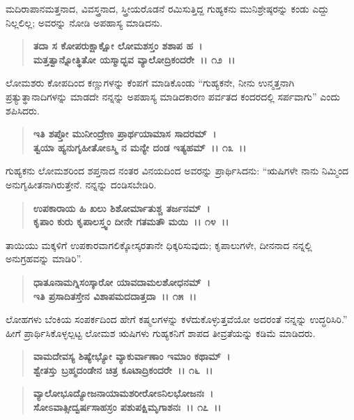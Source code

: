 ಮದಿರಾಪಾನಮತ್ತನಾದ, ವಿವಸ್ತ್ರನಾದ, ಸ್ತ್ರೀಯರೊಡನೆ ರಮಿಸುತ್ತಿದ್ದ ಗುಹ್ಯಕನು ಮುನಿಶ್ರೇಷ್ಠರನ್ನು ಕಂಡು ಎದ್ದು ನಿಲ್ಲಲಿಲ್ಲ; ಅವರನ್ನು ನೋಡಿ ಅಪಹಾಸ್ಯ ಮಾಡಿದನು.

\begin{verse}
\textbf{ತದಾ ಸ ಕೋಪರುಕ್ಷಾಕ್ಷೋ ಲೋಮಶಸ್ತಂ ಶಶಾಪ ಹ~।}\\\textbf{ಮತ್ತತ್ವಾನ್ನೋತ್ಥಿತೋ ಯಸ್ಮಾದ್ಭವ ವ್ಯಾಲೋದ್ರಿಕಂದರೇ~।। ೧೨~।।}
\end{verse}

ಲೋಮಶರು ಕೋಪದಿಂದ ಕಣ್ಣುಗಳನ್ನು ಕೆಂಪಗೆ ಮಾಡಿಕೊಂಡು “ಗುಹ್ಯಕನೇ, ನೀನು ಉನ್ಮತ್ತನಾಗಿ ಪ್ರತ್ಯುತ್ಥಾನಾದಿಗಳನ್ನು ಮಾಡದೇ ನನ್ನನ್ನು ಅಪಹಾಸ್ಯ ಮಾಡಿದಕಾರಣ ಪರ್ವತದ ಕಂದರದಲ್ಲಿ ಸರ್ಪವಾಗು” ಎಂದು ಶಪಿಸಿದರು.

\begin{verse}
\textbf{ಇತಿ ಶಪ್ತೋ ಮುನೀಂದ್ರೇಣ ಪ್ರಾರ್ಥಯಾಮಾಸ ಸಾದರಮ್~।}\\\textbf{ತ್ವಯಾ ಹ್ಯನುಗೃಹೀತೋಽಸ್ಮಿ ನ ಮನ್ಯೇ ದಂಡ ಇತ್ಯಹಮ್~।। ೧೩~।।}
\end{verse}

ಗುಹ್ಯಕನು ಲೋಮಶರಿಂದ ಶಪ್ತನಾದ ನಂತರ ವಿನಯದಿಂದ ಅವರನ್ನು ಪ್ರಾರ್ಥಿಸಿದನು: “ಋಷಿಗಳೇ ನಾನು ನಿಮ್ಮಿಂದ ಅನುಗೃಹೀತನಾಗಿರುತ್ತೇನೆ. ನನ್ನನ್ನು ದಂಡಿಸಬೇಡಿರಿ.

\begin{verse}
\textbf{ಉಪಕಾರಾಯ ಹಿ ಖಲು ಶಿಶೋರ್ಮಾತುಶ್ಚ ತರ್ಜನಮ್~।}\\\textbf{ಕೃಪಾಂ ಕುರು ಕೃಪಾಲಸ್ತ್ವಂ ದೀನೇ ಗತಮತೌ ಮಯಿ~।। ೧೪~।।}
\end{verse}

ತಾಯಿಯು ಮಕ್ಕಳಿಗೆ ಉಪಕಾರವಾಗಲಿಕ್ಕೋಸ್ಕರತಾನೇ ಧಿಕ್ಕರಿಸುವುದು; ಕೃಪಾಲುಗಳೇ, ದೀನನಾದ ನನ್ನಲ್ಲಿ ಅನುಗ್ರಹವನ್ನು ಮಾಡಿರಿ”.

\begin{verse}
\textbf{ಧಾತೂನಾಮಗ್ನಿಸಂಸ್ಕಾರೋ ಯಾವದಾಮಲಶೋಧನಮ್~।}\\\textbf{ಇತಿ ಪ್ರಸಾದಿತಸ್ತೇನ ವಿಶಾಪಮದದಾತ್ತದಾ~।। ೧೫~।।}
\end{verse}

ಲೋಹಗಳು ಬೆಂಕಿಯ ಸಂಪರ್ಕದಿಂದ ಹೇಗೆ ಕಷ್ಮಲಗಳನ್ನು ಕಳೆದುಕೊಳ್ಳುತ್ತವೆಯೋ ಅದರಂತೆ ನನ್ನನ್ನು ಉದ್ಧರಿಸಿರಿ.” ಹೀಗೆ ಪ್ರಾರ್ಥಿಸಿಕೊಳ್ಳಲ್ಪಟ್ಟ ಲೋಮಶ ಋಷಿಗಳು ಗುಹ್ಯಕನಿಗೆ ಶಾಪದ ತೀವ್ರತೆಯನ್ನು ಕಡಿಮೆ ಮಾಡಿದರು.

\begin{verse}
\textbf{ವಾಮದೇವಸ್ಯ ಶಿಷ್ಯೇಭ್ಯೋ ವ್ಯಾಕುರ್ವಾಣಾಂ ಇಮಾಂ ಕಥಾಮ್~।}\\\textbf{ಶ್ವೇತಸ್ತು ಬ್ರಹ್ಮದಂಡೇನ ಚಿತ್ರ ಕೂಟಾದ್ರಿಕಂದರೇ~।। ೧೬~।।}
\end{verse}

\begin{verse}
\textbf{ವ್ಯಾಲೋಭೂದ್ಯೋಜನಾಯಾಮಶರೀರೋಽನಿಲಭೋಜನಃ~।}\\\textbf{ಸೋಽವಾತ್ಸೀದ್ವರ್ಷಸಾಹಸ್ರಂ ಪಶುಪಕ್ಷಿಮೃಗಾಶನಃ~।। ೧೭~।।}
\end{verse}

